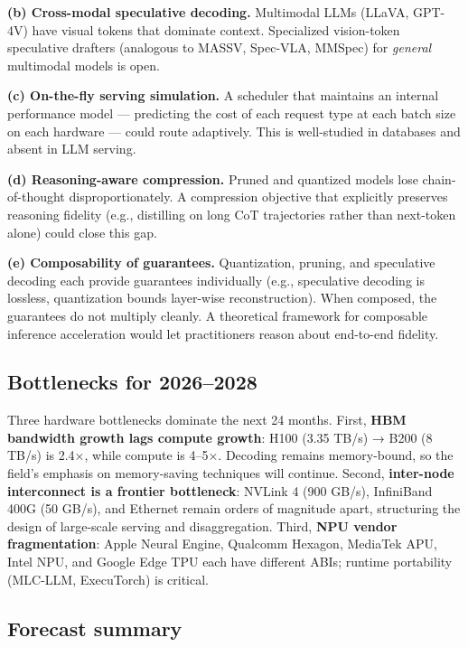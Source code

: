 \documentclass{article}
\begin{document}
\textbf{(b) Cross-modal speculative decoding.} Multimodal LLMs (LLaVA, GPT-4V) have visual tokens that dominate context. Specialized vision-token speculative drafters (analogous to MASSV, Spec-VLA, MMSpec) for \emph{general} multimodal models is open.

\textbf{(c) On-the-fly serving simulation.} A scheduler that maintains an internal performance model --- predicting the cost of each request type at each batch size on each hardware --- could route adaptively. This is well-studied in databases and absent in LLM serving.

\textbf{(d) Reasoning-aware compression.} Pruned and quantized models lose chain-of-thought disproportionately. A compression objective that explicitly preserves reasoning fidelity (e.g., distilling on long CoT trajectories rather than next-token alone) could close this gap.

\textbf{(e) Composability of guarantees.} Quantization, pruning, and speculative decoding each provide guarantees individually (e.g., speculative decoding is lossless, quantization bounds layer-wise reconstruction). When composed, the guarantees do not multiply cleanly. A theoretical framework for composable inference acceleration would let practitioners reason about end-to-end fidelity.

\subsection{Bottlenecks for 2026--2028}\label{bottlenecks-for-20262028}

Three hardware bottlenecks dominate the next 24 months. First, \textbf{HBM bandwidth growth lags compute growth}: H100 (3.35 TB/s) → B200 (8 TB/s) is 2.4×, while compute is 4--5×. Decoding remains memory-bound, so the field's emphasis on memory-saving techniques will continue. Second, \textbf{inter-node interconnect is a frontier bottleneck}: NVLink 4 (900 GB/s), InfiniBand 400G (50 GB/s), and Ethernet remain orders of magnitude apart, structuring the design of large-scale serving and disaggregation. Third, \textbf{NPU vendor fragmentation}: Apple Neural Engine, Qualcomm Hexagon, MediaTek APU, Intel NPU, and Google Edge TPU each have different ABIs; runtime portability (MLC-LLM, ExecuTorch) is critical.

\subsection{Forecast summary}\label{forecast-summary}
\end{document}
